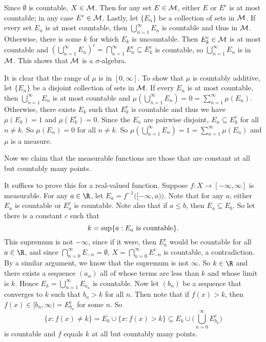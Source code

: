 \proof Since $\emptyset$ is countable, $X\in {\cal M}$. Then for any set $E\in {\cal M}$, either $E$ or $E^c$ is at most countable; in any case $E^c\in {\cal M}$. Lastly, let $\{E_n\}$ be a collection of sets in ${\cal M}$. If every set $E_n$ is at most countable, then $\bigcup_{n=1}^\infty E_n$ is countable and thus in ${\cal M}$. Otherwise, there is some $k$ for which $E_k$ is uncountable. Then $E_k^c\in {\cal M}$ is at most countable and $\left(\bigcup_{n=1}^\infty E_n\right)^c = \bigcap_{n=1}^\infty E_n^c \subseteq E_k^c$ is countable, so $\bigcup_{n=1}^\infty E_n$ is in ${\cal M}$. This shows that ${\cal M}$ is a $\sigma$-algebra.

It is clear that the range of $\mu$ is in $[0,\infty]$. To show that $\mu$ is countably additive, let $\{E_n\}$ be a disjoint collection of sets in ${\cal M}$. If every $E_n$ is at most countable, then $\bigcup_{n=1}^\infty E_n$ is at most countable and $\mu(\bigcup_{n=1}^\infty E_n) = 0 = \sum_{n=1}^\infty \mu(E_n)$. Otherwise, there exists $E_k$ such that $E_k^c$ is countable and thus we have $\mu(E_k) = 1$ and $\mu(E_k^c) = 0$. Since the $E_n$ are pairwise disjoint, $E_n\subseteq E_k^c$ for all $n\neq k$. So $\mu(E_n) = 0$ for all $n\neq k$. So $\mu(\bigcup_{n=1}^\infty E_n) = 1 = \sum_{n=1}^\infty \mu(E_n)$ and $\mu$ is a measure.\slug

\noindent Now we claim that the measurable functions are those that are constant at all but countably many points.

\proof It suffices to prove this for a real-valued function. Suppose $f:X\rightarrow[-\infty,\infty]$ is measurable. For any $a\in \R$, let $E_a = f^{-1}\big([-\infty,a)\big)$. Note that for any $a$, either $E_a$ is countable or $E_a^c$ is countable. Note also that if $a\leq b$, then $E_a \subseteq E_b$. So let there is a constant $c$ such that
$$k = \sup\{a : E_a\ \hbox{is countable}\}.$$
This supremum is not $-\infty$, since if it were, then $E_a^c$ would be countable for all $a\in \R$, and since $\bigcap_{n=0}^\infty E_{-n} = \emptyset$, $X = \bigcap_{n=0}^\infty E_{-n}^c$ is countable, a contradiction. By a similar argument, we know that the supremum is not $\infty$. So $k\in \R$ and there exists a sequence $(a_n)$ all of whose terms are less than $k$ and whose limit is $k$. Hence $E_k = \bigcup_{n=1}^\infty E_{a_n}$ is countable. Now let $(b_n)$ be a sequence that converges to $k$ such that $b_n > k$ for all $n$. Then note that if $f(x) > k$, then $f(x) \in [b_n, \infty) = E_{b_n}^c$ for some $n$. So
$$\{x : f(x) \neq k\} = E_k \cup \{x : f(x) > k\} \subseteq E_k \cup \Big(\bigcup_{n=0}^\infty E_{b_n}^c\Big)$$
is countable and $f$ equals $k$ at all but countably many points.\slug

